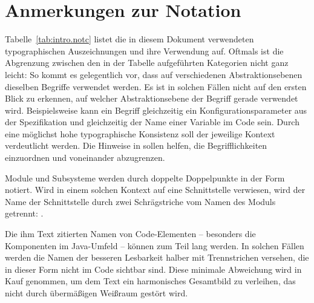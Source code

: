 \section*{Anmerkungen zur Notation}

Tabelle~\vref{tab:intro.notc} listet die in diesem Dokument verwendeten
typographischen Auszeichnungen und ihre Verwendung auf. Oftmals ist die
Abgrenzung zwischen den in der Tabelle aufgeführten Kategorien nicht ganz
leicht: So kommt es gelegentlich vor, dass auf verschiedenen Abstraktionsebenen
dieselben Begriffe verwendet werden. Es ist in solchen Fällen nicht auf den
ersten Blick zu erkennen, auf welcher Abstraktionsebene der Begriff gerade
verwendet wird. Beispielsweise kann ein Begriff gleichzeitig ein
Konfigurationsparameter aus der Spezifikation und gleichzeitig der Name einer
Variable im Code sein. Durch eine möglichst hohe typographische Konsistenz soll
der jeweilige Kontext verdeutlicht werden. Die Hinweise in
 sollen helfen, die Begrifflichkeiten einzuordnen und
voneinander abzugrenzen.

Module und Subsysteme werden durch doppelte Doppelpunkte in der Form
 notiert. Wird in einem solchen Kontext
auf eine Schnittstelle verwiesen, wird der Name der Schnittstelle durch zwei
Schrägstriche vom Namen des Moduls getrennt:
.

Die ihm Text zitierten Namen von Code-Elementen -- besonders die Komponenten im
Java-Umfeld -- können zum Teil lang werden. In solchen Fällen werden die Namen
der besseren Lesbarkeit halber mit Trennstrichen versehen, die in dieser Form
nicht im Code sichtbar sind. Diese minimale Abweichung wird in Kauf genommen, um
dem Text ein harmonisches Gesamtbild zu verleihen, das nicht durch übermäßigen
Weißraum gestört wird.

